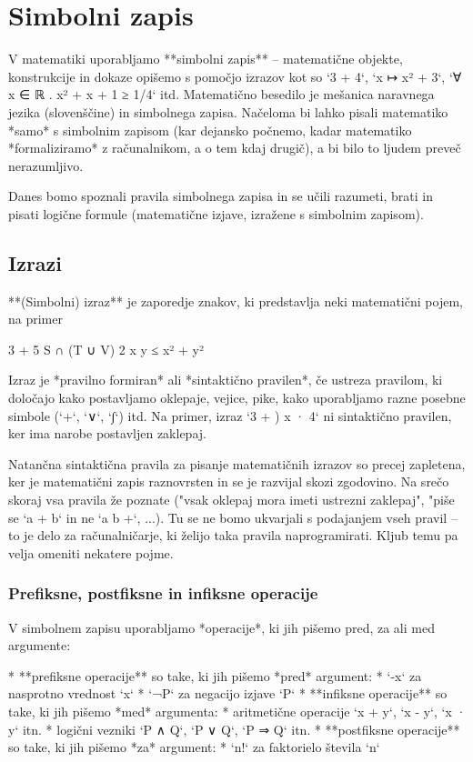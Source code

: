 \chapter{Simbolni zapis}

V matematiki uporabljamo **simbolni zapis** – matematične objekte, konstrukcije in dokaze opišemo s pomočjo izrazov kot
so `3 + 4`, `x ↦ x² + 3`, `∀ x ∈ ℝ . x² + x + 1 ≥ 1/4` itd. Matematično besedilo je mešanica naravnega jezika
(slovenščine) in simbolnega zapisa. Načeloma bi lahko pisali matematiko *samo* s simbolnim zapisom (kar dejansko
počnemo, kadar matematiko *formaliziramo* z računalnikom, a o tem kdaj drugič), a bi bilo to ljudem preveč nerazumljivo.

Danes bomo spoznali pravila simbolnega zapisa in se učili razumeti, brati in pisati logične formule (matematične izjave,
izražene s simbolnim zapisom).

\section{Izrazi}

**(Simbolni) izraz** je zaporedje znakov, ki predstavlja neki matematični pojem, na primer

    3 + 5
    S ∩ (T ∪ V)
    2 x y ≤ x² + y²

Izraz je *pravilno formiran* ali *sintaktično pravilen*, če ustreza pravilom, ki določajo kako postavljamo oklepaje,
vejice, pike, kako uporabljamo razne posebne simbole (`+`, `∨`, `∫`) itd. Na primer, izraz `3 + ) x · 4` ni sintaktično
pravilen, ker ima narobe postavljen zaklepaj.

Natančna sintaktična pravila za pisanje matematičnih izrazov so precej zapletena, ker je matematični zapis raznovrsten
in se je razvijal skozi zgodovino. Na srečo skoraj vsa pravila že poznate ("vsak oklepaj mora imeti ustrezni zaklepaj",
"piše se `a + b` in ne `a b +`, ...). Tu se ne bomo ukvarjali s podajanjem vseh pravil – to je delo za računalničarje,
ki želijo taka pravila naprogramirati. Kljub temu pa velja omeniti nekatere pojme.


\subsection{Prefiksne, postfiksne in infiksne operacije}

V simbolnem zapisu uporabljamo *operacije*, ki jih pišemo pred, za ali med argumente:

* **prefiksne operacije** so take, ki jih pišemo *pred* argument:
    * `-x` za nasprotno vrednost `x`
    * `¬P` za negacijo izjave `P`
* **infiksne operacije** so take, ki jih pišemo *med* argumenta:
    * aritmetične operacije `x + y`, `x - y`, `x · y` itn.
    * logični vezniki `P ∧ Q`, `P ∨ Q`, `P ⇒ Q` itn.
* **postfiksne operacije** so take, ki jih pišemo *za* argument:
    * `n!` za faktorielo števila `n`

